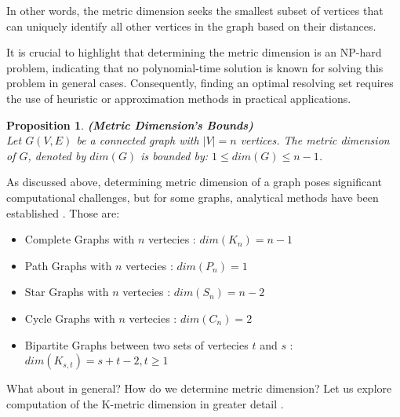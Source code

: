\documentclass[12pt]{amsart}
\theoremstyle{plain}
\newtheorem*{proposition}{Proposition}
\begin{document}
\vspace{-0.3cm}

In other words, the metric dimension seeks the smallest subset of vertices that can uniquely identify all other vertices in the graph based on their distances.

It is crucial to highlight that determining the metric dimension is an NP-hard problem, indicating that no polynomial-time solution is known for solving this problem in general cases. Consequently, finding an optimal resolving set requires the use of heuristic or approximation methods in practical applications.

\vspace{-0.2cm}

\begin{proposition} \textbf{(Metric Dimension's Bounds)} \\
  Let $ G(V, E) $ be a connected graph with $|V| = n $ vertices. The metric dimension of $G$, denoted by $dim(G)$  is bounded by: $ 1 \leq dim(G) \leq n-1 $.
\end{proposition}

\newpage

As discussed above, determining metric dimension of a graph poses significant computational challenges, but for some graphs, analytical methods have been established \cite{metric_dim_ALGO}. Those are:

\begin{itemize}
  \item Complete Graphs with $n$ vertecies : $ dim (K_n) = n - 1 $
  \item Path Graphs with $n$ vertecies : $ dim (P_n) = 1 $
  \item Star Graphs with $n$ vertecies : $ dim (S_n) = n - 2 $
  \item Cycle Graphs with $n$ vertecies : $ dim (C_n) = 2 $
  \item Bipartite Graphs between two sets of vertecies $t$ and $s$ : $ dim(K_{s,t}) = s + t - 2, t \geq 1$
\end{itemize}

What about in general? How do we determine metric dimension? Let us explore computation of the K-metric dimension in greater detail \cite{metric_dim_ILP}.

\vspace{0.1cm}
\end{document}
